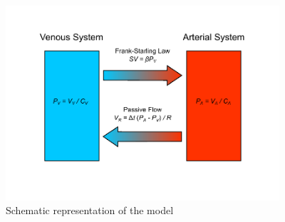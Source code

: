 \documentclass[%
preprint,
 amsmath,amssymb,
 aps,
]{revtex4-2}
\begin{document}
\begin{figure}
\includegraphics[width=4in]{model.pdf}
\caption{Schematic representation of the model}
\label{fig:model}
\end{figure}
\end{document}
